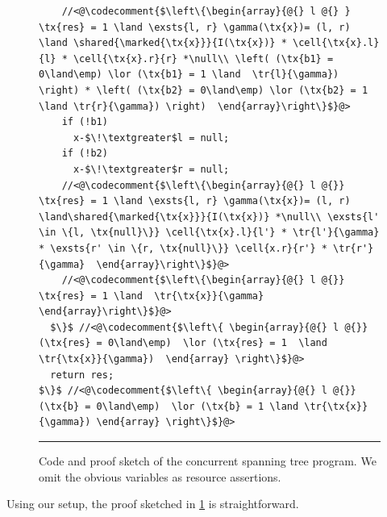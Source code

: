 \begin{figure}
\begin{lstlisting}
    //<@\codecomment{$\left\{\begin{array}{@{} l @{} } \tx{res} = 1 \land \exsts{l, r} \gamma(\tx{x})= (l, r) \land \shared{\marked{\tx{x}}}{I(\tx{x})} * \cell{\tx{x}.l}{l} * \cell{\tx{x}.r}{r} *\null\\ \left( (\tx{b1} = 0\land\emp) \lor (\tx{b1} = 1 \land  \tr{l}{\gamma}) \right) * \left( (\tx{b2} = 0\land\emp) \lor (\tx{b2} = 1 \land \tr{r}{\gamma}) \right)  \end{array}\right\}$}@>
    if (!b1)
      x-$\!\textgreater$l = null;
    if (!b2)
      x-$\!\textgreater$r = null;
    //<@\codecomment{$\left\{\begin{array}{@{} l @{}}  \tx{res} = 1 \land \exsts{l, r} \gamma(\tx{x})= (l, r) \land\shared{\marked{\tx{x}}}{I(\tx{x})} *\null\\ \exsts{l' \in \{l, \tx{null}\}} \cell{\tx{x}.l}{l'} * \tr{l'}{\gamma} * \exsts{r' \in \{r, \tx{null}\}} \cell{x.r}{r'} * \tr{r'}{\gamma}  \end{array}\right\}$}@>
    //<@\codecomment{$\left\{\begin{array}{@{} l @{}} \tx{res} = 1 \land  \tr{\tx{x}}{\gamma}    \end{array}\right\}$}@>
  $\}$ //<@\codecomment{$\left\{ \begin{array}{@{} l @{}} (\tx{res} = 0\land\emp)  \lor (\tx{res} = 1  \land \tr{\tx{x}}{\gamma})  \end{array} \right\}$}@>
  return res;
$\}$ //<@\codecomment{$\left\{ \begin{array}{@{} l @{}} (\tx{b} = 0\land\emp)  \lor (\tx{b} = 1 \land \tr{\tx{x}}{\gamma}) \end{array} \right\}$}@>
\end{lstlisting}
\hrule\vspace*{-6pt}
\caption{Code and proof sketch of the concurrent spanning tree
  program. We omit the obvious variables as resource assertions.}
\label{fig:conSpanningTree}
\end{figure}

Using our setup, the proof sketched in \fig\ref{fig:conSpanningTree}
is straightforward.

